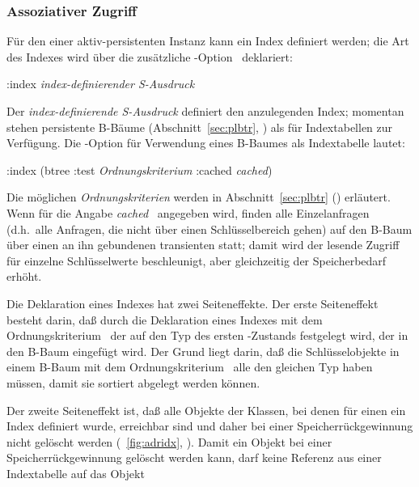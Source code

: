 \subsubsection{Assoziativer Zugriff}
%
F\"{u}r den \Slt\/ einer aktiv-persistenten Instanz kann ein Index
definiert werden; die Art des Indexes wird \"{u}ber die
zu\-s\"{a}tz\-li\-che \Slt\/-Option \ deklariert:
%
\begin{listing}[\tt]%
:index {\rm\it\lt{}index-definierender S-Ausdruck\gt\/}
\end{listing}%
%
\noindent Der {\rm\it\lt{}index-definierende S-Ausdruck\gt\/}
definiert den anzulegenden Index; momentan stehen persistente B-B\"{a}ume
(Abschnitt~\ref{sec:plbtr}, \citepage{\pageref{sec:plbtr}}) als
\representation{} f\"{u}r Indextabellen zur Verf\"{u}gung. Die \Slt\/-Option
f\"{u}r Verwendung eines B-Baumes als Indextabelle lautet:
%
\begin{listing}[\tt]%
:index (btree :test {\rm\it\lt{}Ordnungskriterium\gt\/}
                    :cached {\rm\it\lt{}cached\gt\/})
\end{listing}%
%
\noindent Die m\"{o}glichen {\rm\it\lt{}Ordnungskriterien\gt\/} werden
in Abschnitt~\ref{sec:plbtr} (\citepage{\pageref{sec:plbtr}})
erl\"{a}utert. Wenn f\"{u}r die Angabe {\rm\it\lt{}cached\gt\/}
\nonnil\ angegeben wird, finden alle Einzelanfragen (d.h.\ alle
Anfragen, die nicht \"{u}ber einen Schl\"{u}sselbereich gehen) auf den
B-Baum \"{u}ber einen an ihn gebundenen transienten \cache\/ statt; damit
wird der lesende Zugriff f\"{u}r einzelne Schl\"{u}sselwerte beschleunigt,
aber gleichzeitig der Speicherbedarf erh\"{o}ht.
%
\par{}Die Deklaration eines Indexes hat zwei Seiteneffekte. Der erste
Seiteneffekt besteht darin, da\ss{} durch die Deklaration eines Indexes
mit dem Ordnungskriterium \ der \Slt\/ auf den Typ des
ersten \Slt\/-Zustands festgelegt wird, der in den B-Baum eingef\"{u}gt
wird. Der Grund liegt darin, da\ss{} die Schl\"{u}sselobjekte in einem
B-Baum mit dem Ordnungskriterium \ alle den gleichen Typ
haben m\"{u}ssen, damit sie sortiert abgelegt werden k\"{o}nnen.
%
\par{}Der zweite Seiteneffekt ist, da\ss{} alle Objekte der Klassen,
bei denen f\"{u}r einen \Slt\/ ein Index definiert wurde, erreichbar sind
und daher bei einer Speicherr\"{u}ckgewinnung nicht gel\"{o}scht werden
(\figurename~\ref{fig:adridx}, \citepage{\pageref{fig:adridx}}).
Damit ein Objekt bei einer Speicherr\"{u}ckgewinnung gel\"{o}scht
werden kann, darf keine Referenz aus einer Indextabelle auf das Objekt
